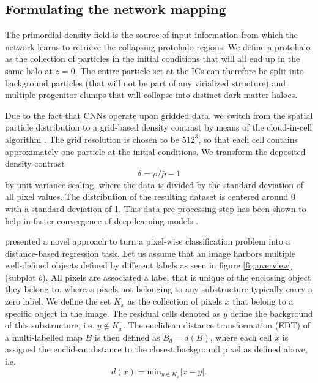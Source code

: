\documentclass[fleqn,usenatbib]{mnras}
\begin{document}
\subsection{Formulating the network mapping}\label{sec:network_mapping}
The primordial density field is the source of input information from which the network learns to retrieve the collapsing protohalo regions. 
We define a protohalo as the collection of particles in the initial conditions that will all end up in the same halo at $z=0$. The entire particle set at the ICs can therefore be split into background particles (that will not be part of any virialized structure) and multiple progenitor clumps that will collapse into distinct dark matter haloes.\par
Due to the fact that CNNs operate upon gridded data, we switch from the spatial particle distribution to a grid-based density contrast by means of the cloud-in-cell algorithm \cite[e.g.][]{Howlett2015}. The grid resolution is chosen to be $512^{3}$, so that each cell contains approximately one particle at the initial conditions. We transform the deposited density contrast
\begin{equation}
    \delta = \rho / \bar{\rho} - 1
\end{equation}
by unit-variance scaling, where the data is divided by the standard deviation of all pixel values. The distribution of the resulting dataset is centered around 0 with a standard deviation of 1. This data pre-processing step has been shown to help in faster convergence of deep learning models \citep{LeCun1998}. \par
\cite{Naylor2019} presented a novel approach to turn a pixel-wise classification problem into a distance-based regression task.
Let us assume that an image harbors multiple well-defined objects defined by different labels as seen in figure \ref{fig:overview} (subplot $b$). All pixels are associated a label that is unique of the enclosing object they belong to, whereas pixels not belonging to any substructure typically carry a zero label. We define the set $K_{x}$ as the collection of pixels $x$ that belong to a specific object in the image. The residual cells denoted as $y$ define the background of this substructure, i.e. $y\not\in K_{x}$. The euclidean distance transformation (EDT) of a multi-labelled map $B$ is then defined as $B_{d}=d(B)$, where each cell $x$ is assigned the euclidean distance to the closest background pixel as defined above, i.e.
\begin{equation}
    d(x)=\text{min}_{y\not\in K_{x}}{\left| x-y \right|}.
    \label{eq:distance}
\end{equation}
\end{document}
